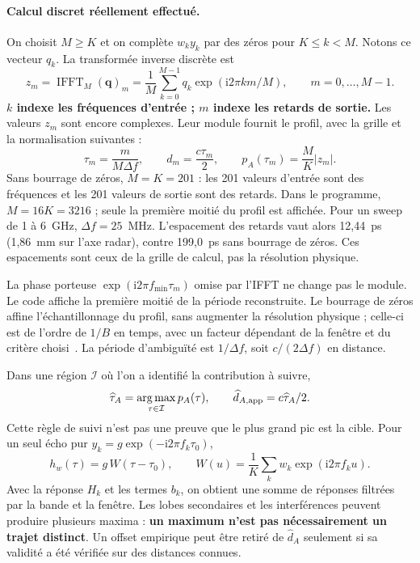 \documentclass[11pt,a4paper]{article}
\newcommand{\ii}{\mathrm{i}}
\begin{document}
\paragraph{Calcul discret réellement effectué.}
On choisit $M\geq K$ et on complète $w_k y_k$ par des zéros pour $K\leq k<M$.
Notons ce vecteur $q_k$. La transformée inverse discrète est
\begin{equation}
 z_m=\operatorname{IFFT}_M(\mathbf q)_m
 =\frac1M\sum_{k=0}^{M-1}q_k\exp(\ii2\pi km/M),
 \qquad m=0,\ldots,M-1.
\end{equation}
\textbf{$k$ indexe les fréquences d'entrée ; $m$ indexe les retards de sortie.}
Les valeurs $z_m$ sont encore complexes. Leur module fournit le profil,
avec la grille et la normalisation suivantes :
\begin{equation}
 \tau_m=\frac{m}{M\Delta f},\qquad
 d_m=\frac{c\tau_m}{2},\qquad
 p_A(\tau_m)=\frac{M}{K}
 |z_m|.
\end{equation}
Sans bourrage de zéros, $M=K=201$ : les 201 valeurs d'entrée sont des
fréquences et les 201 valeurs de sortie sont des retards. Dans le programme,
$M=16K=3216$ ; seule la première moitié du profil est affichée. Pour un sweep
de 1 à 6~GHz, $\Delta f=25$~MHz. L'espacement des retards vaut alors
12,44~ps (1,86~mm sur l'axe radar), contre 199,0~ps sans bourrage de zéros.
Ces espacements sont ceux de la grille de calcul, pas la résolution physique.

La phase porteuse $\exp(\ii2\pi f_{\min}\tau_m)$ omise par l'IFFT ne change
pas le module. Le code affiche la première moitié de la période reconstruite.
Le bourrage de zéros affine l'échantillonnage du profil, sans augmenter la
résolution physique ; celle-ci est de l'ordre de $1/B$ en temps, avec un
facteur dépendant de la fenêtre et du critère choisi~\cite{keysight}.
La période d'ambiguïté est $1/\Delta f$, soit $c/(2\Delta f)$ en distance.

Dans une région $\mathcal I$ où l'on a identifié la contribution à suivre,
\begin{equation}
 \widehat\tau_A=\underset{\tau\in\mathcal I}{\operatorname{arg\,max}}\,p_A(\tau),
 \qquad \widehat d_{A,\rm app}=c\widehat\tau_A/2.
\end{equation}
Cette règle de suivi n'est pas une preuve que le plus grand pic est la cible.
Pour un seul écho pur $y_k=g\exp(-\ii2\pi f_k\tau_0)$,
\begin{equation}
 h_w(\tau)=g\,W(\tau-\tau_0),\qquad
 W(u)=\frac1K\sum_kw_k\exp(\ii2\pi f_ku).
\end{equation}
Avec la réponse $H_k$ et les termes $b_k$, on obtient une somme de réponses
filtrées par la bande et la fenêtre. Les lobes secondaires et les interférences
peuvent produire plusieurs maxima : \textbf{un maximum n'est pas nécessairement
un trajet distinct}. Un offset empirique peut être retiré de $\widehat d_A$
seulement si sa validité a été vérifiée sur des distances connues.
\end{document}
